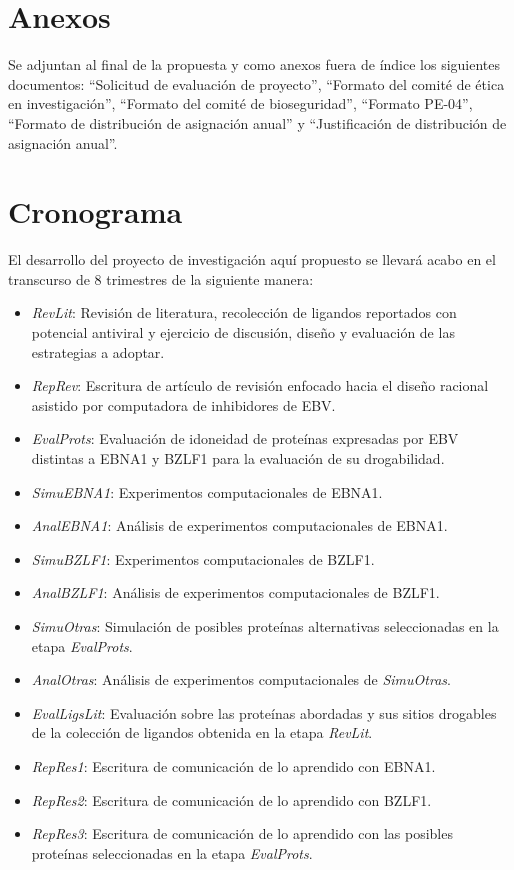 \documentclass[11pt,letterpaper,titlepage]{article} %
\begin{document}
\section{Anexos}

Se adjuntan al final de la propuesta y como anexos fuera de índice los
siguientes documentos: ``Solicitud de evaluación de proyecto'', ``Formato del
comité de ética en investigación'', ``Formato del comité de bioseguridad'',
``Formato PE-04'', ``Formato de distribución de asignación anual'' y
``Justificación de distribución de asignación anual''.

\section{Cronograma}

El desarrollo del proyecto de investigación aquí propuesto se llevará acabo en
el transcurso de 8 trimestres de la siguiente manera:

\begin{itemize}
\item \emph{RevLit}: Revisión de literatura, recolección de ligandos reportados
  con potencial antiviral y ejercicio de discusión, diseño y evaluación de las
  estrategias a adoptar.
	\item \emph{RepRev}: Escritura de artículo de revisión enfocado hacia el diseño
    racional asistido por computadora de inhibidores de EBV.
	\item \emph{EvalProts}: Evaluación de idoneidad de proteínas expresadas por
    EBV distintas a EBNA1 y BZLF1 para la evaluación de su drogabilidad.
	\item \emph{SimuEBNA1}: Experimentos computacionales de EBNA1. 
	\item \emph{AnalEBNA1}: Análisis de experimentos computacionales de EBNA1.
	\item \emph{SimuBZLF1}: Experimentos computacionales de BZLF1.
	\item \emph{AnalBZLF1}: Análisis de experimentos computacionales de BZLF1. 
	\item \emph{SimuOtras}: Simulación de posibles proteínas alternativas
    seleccionadas en la etapa \emph{EvalProts}.
	\item \emph{AnalOtras}: Análisis de experimentos computacionales de \emph{SimuOtras}.
	\item \emph{EvalLigsLit}: Evaluación sobre las proteínas abordadas y sus
    sitios drogables de la colección de ligandos obtenida en la etapa \emph{RevLit}.
	\item \emph{RepRes1}: Escritura de comunicación de lo aprendido con EBNA1.
	\item \emph{RepRes2}: Escritura de comunicación de lo aprendido con BZLF1.
	\item \emph{RepRes3}: Escritura de comunicación de lo aprendido con las
    posibles proteínas seleccionadas en la etapa \emph{EvalProts}.
  \end{itemize}
  
\end{document}
